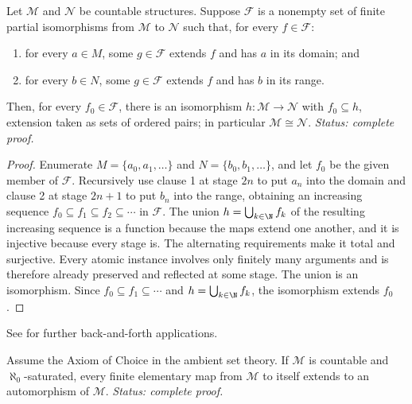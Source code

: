 \begin{theorem}
\label{thm:back-and-forth-test}
Let \(\mathcal M\) and \(\mathcal N\) be countable structures.  Suppose
\(\mathcal F\) is a nonempty set of finite partial isomorphisms from
\(\mathcal M\) to \(\mathcal N\) such that, for every \(f\in\mathcal F\):
\begin{enumerate}
  \item for every \(a\in M\), some \(g\in\mathcal F\) extends \(f\) and has
        \(a\) in its domain; and
  \item for every \(b\in N\), some \(g\in\mathcal F\) extends \(f\) and has
        \(b\) in its range.
\end{enumerate}
Then, for every \(f_0\in\mathcal F\), there is an isomorphism
\(h:\mathcal M\to\mathcal N\) with \(f_0\subseteq h\), extension taken as
sets of ordered pairs; in particular \(\mathcal M\cong\mathcal N\).
\textit{Status: complete proof.}
\end{theorem}

\begin{proof}
Enumerate \(M=\{a_0,a_1,\ldots\}\) and
\(N=\{b_0,b_1,\ldots\}\), and let \(f_0\) be the given member of
\(\mathcal F\).
Recursively use clause 1 at stage \(2n\) to put \(a_n\) into the domain and
clause 2 at stage \(2n+1\) to put \(b_n\) into the range, obtaining an
increasing sequence \(f_0\subseteq f_1\subseteq f_2\subseteq\cdots\) in
\(\mathcal F\).  The union \(h=\bigcup_{k\in\N}f_k\) of the
resulting increasing sequence is a function because the maps extend one
another, and it is injective because every stage is.  The alternating
requirements make it total and surjective.  Every atomic instance involves
only finitely many arguments and is therefore already preserved and reflected
at some stage.  The union is an isomorphism.  Since
\(f_0\subseteq f_1\subseteq\cdots\) and \(h=\bigcup_{k\in\N}f_k\), the
isomorphism extends \(f_0\).
\end{proof}

See \cite{Hodges1993,Marker2002} for further back-and-forth applications.

\begin{corollary}
Assume the Axiom of Choice in the ambient set theory.
If \(\mathcal M\) is countable and \(\aleph_0\)-saturated, every finite
elementary map from \(\mathcal M\) to itself extends to an automorphism of
\(\mathcal M\).
\textit{Status: complete proof.}
\end{corollary}

